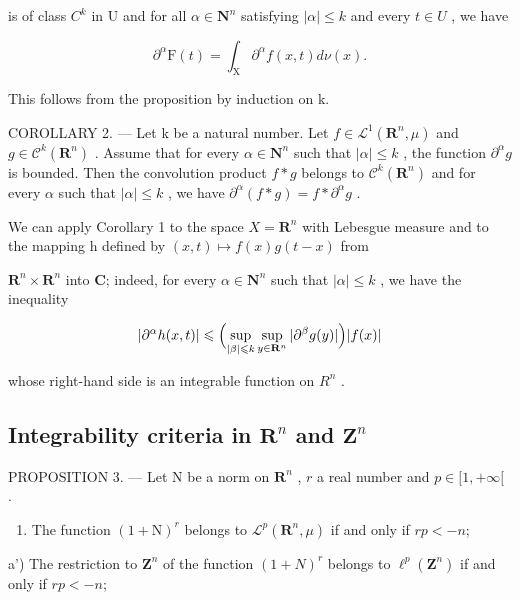 is of class \(C^{k}\) in U and for all \(\alpha\in \mathbf{N}^{n}\) satisfying \(|\alpha|\leqslant k\) and every \(t\in U\) , we have

\[
\partial^ {\alpha} \mathrm{F} (t) = \int_ {\mathrm{X}} \partial^ {\alpha} f (x, t) d \nu (x).
\]

This follows from the proposition by induction on k.

COROLLARY 2. --- Let k be a natural number. Let \(f \in \mathcal{L}^1(\mathbf{R}^n, \mu)\) and \(g \in \mathcal{C}^k(\mathbf{R}^n)\) . Assume that for every \(\alpha \in \mathbf{N}^n\) such that \(|\alpha| \leqslant k\) , the function \(\partial^\alpha g\) is bounded. Then the convolution product \(f * g\) belongs to \(\mathcal{C}^k(\mathbf{R}^n)\) and for every \(\alpha\) such that \(|\alpha| \leqslant k\) , we have \(\partial^\alpha(f * g) = f * \partial^\alpha g\) .

We can apply Corollary 1 to the space \(X = \mathbf{R}^{n}\) with Lebesgue measure and to the mapping h defined by \((x, t) \mapsto f(x)g(t - x)\) from

\(\mathbf{R}^{n} \times \mathbf{R}^{n}\) into \(\mathbf{C}\); indeed, for every \(\alpha \in \mathbf{N}^{n}\) such that \(|\alpha| \leqslant k\) , we have the inequality

\[
| \partial^ {\alpha} h (x, t) | \leqslant \Bigl (\sup _ {| \beta | \leqslant k} \sup _ {y \in \mathbf {R} ^ {n}} | \partial^ {\beta} g (y) | \Bigr) | f (x) |
\]

whose right-hand side is an integrable function on \(R^{n}\) .

\subsection{\texorpdfstring{Integrability criteria in \(\mathbf{R}^{n}\) and \(\mathbf{Z}^{n}\)}{Integrability criteria in \textbackslash mathbf\{R\}\^{}\{n\} and \textbackslash mathbf\{Z\}\^{}\{n\}}}

PROPOSITION 3. --- Let N be a norm on \(\mathbf{R}^{n}\) , \(r\) a real number and \(p \in [1, +\infty[\) .

\begin{enumerate}
\def\labelenumi{\alph{enumi})}
\tightlist
\item
  The function \((1 + \mathrm{N})^{r}\) belongs to \(\mathcal{L}^{p}(\mathbf{R}^{n}, \mu)\) if and only if \(rp < -n\);
\end{enumerate}

a') The restriction to \(\mathbf{Z}^{n}\) of the function \((1+N)^{r}\) belongs to \(\ell^{p}(\mathbf{Z}^{n})\) if and only if \(rp < -n\);

